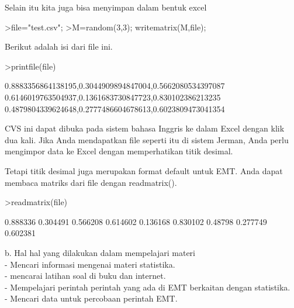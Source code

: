 \documentclass[a4paper,10pt]{article}
\begin{document}
\begin{eulernotebook}
\begin{eulercomment}
\begin{eulercomment}
\begin{eulercomment}
\begin{eulercomment}
\begin{eulercomment}
\begin{eulercomment}
\begin{eulercomment}
\begin{eulercomment}
\begin{eulercomment}
\begin{eulercomment}
\begin{eulercomment}
\begin{eulercomment}
\begin{euleroutput}
\end{euleroutput}
\begin{eulercomment}
Selain itu kita juga bisa menyimpan dalam bentuk excel
\end{eulercomment}
\begin{eulerprompt}
>file="test.csv";
>M=random(3,3); writematrix(M,file);
\end{eulerprompt}
\begin{eulercomment}
Berikut adalah isi dari file ini.
\end{eulercomment}
\begin{eulerprompt}
>printfile(file)
\end{eulerprompt}
\begin{euleroutput}
  0.8883356864138195,0.3044909894847004,0.5662080534397087
  0.6146019763504937,0.1361683730847723,0.830102386213235
  0.4879804339624648,0.2777486604678613,0.6023809473041354
  
\end{euleroutput}
\begin{eulercomment}
CVS ini dapat dibuka pada sistem bahasa Inggris ke dalam Excel dengan
klik dua kali. Jika Anda mendapatkan file seperti itu di sistem
Jerman, Anda perlu mengimpor data ke Excel dengan memperhatikan titik
desimal.

Tetapi titik desimal juga merupakan format default untuk EMT. Anda
dapat membaca matriks dari file dengan readmatrix().
\end{eulercomment}
\begin{eulerprompt}
>readmatrix(file)
\end{eulerprompt}
\begin{euleroutput}
       0.888336      0.304491      0.566208 
       0.614602      0.136168      0.830102 
        0.48798      0.277749      0.602381 
\end{euleroutput}
\begin{eulercomment}
b. Hal hal yang dilakukan dalam mempelajari materi\\
- Mencari informasi mengenai materi statistika.\\
- mencarai latihan soal di buku dan internet.\\
- Mempelajari perintah perintah yang ada di EMT berkaitan dengan
statistika.\\
- Mencari data untuk percobaan perintah EMT.


\end{eulercomment}
\end{eulercomment}
\end{eulercomment}
\end{eulercomment}
\end{eulercomment}
\end{eulercomment}
\end{eulercomment}
\end{eulercomment}
\end{eulercomment}
\end{eulercomment}
\end{eulercomment}
\end{eulercomment}
\end{eulercomment}
\end{eulernotebook}
\end{document}
